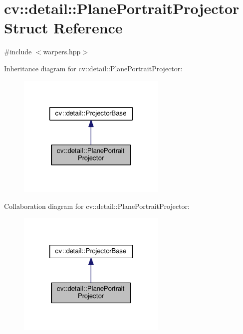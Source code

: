 \hypertarget{structcv_1_1detail_1_1PlanePortraitProjector}{\section{cv\-:\-:detail\-:\-:Plane\-Portrait\-Projector Struct Reference}
\label{structcv_1_1detail_1_1PlanePortraitProjector}
}


{\ttfamily \#include $<$warpers.\-hpp$>$}



Inheritance diagram for cv\-:\-:detail\-:\-:Plane\-Portrait\-Projector\-:\nopagebreak
\begin{figure}[H]
\begin{center}
\leavevmode
\includegraphics[width=202pt]{structcv_1_1detail_1_1PlanePortraitProjector__inherit__graph}
\end{center}
\end{figure}


Collaboration diagram for cv\-:\-:detail\-:\-:Plane\-Portrait\-Projector\-:\nopagebreak
\begin{figure}[H]
\begin{center}
\leavevmode
\includegraphics[width=202pt]{structcv_1_1detail_1_1PlanePortraitProjector__coll__graph}
\end{center}
\end{figure}
